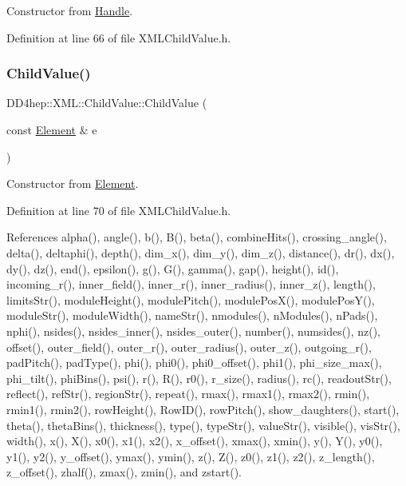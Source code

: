Constructor from \hyperlink{class_d_d4hep_1_1_handle}{Handle}. 



Definition at line 66 of file X\+M\+L\+Child\+Value.\+h.

\hypertarget{struct_d_d4hep_1_1_x_m_l_1_1_child_value_a1295821eee0759c3d9617408b40aedac}{}\label{struct_d_d4hep_1_1_x_m_l_1_1_child_value_a1295821eee0759c3d9617408b40aedac} 
\subsubsection{\texorpdfstring{Child\+Value()}{ChildValue()}\hspace{0.1cm}{\footnotesize\ttfamily [3/3]}}
{\footnotesize\ttfamily D\+D4hep\+::\+X\+M\+L\+::\+Child\+Value\+::\+Child\+Value (\begin{DoxyParamCaption}\item[{const \hyperlink{class_d_d4hep_1_1_x_m_l_1_1_element}{Element} \&}]{e }\end{DoxyParamCaption})\hspace{0.3cm}{\ttfamily [inline]}}



Constructor from \hyperlink{class_d_d4hep_1_1_x_m_l_1_1_element}{Element}. 



Definition at line 70 of file X\+M\+L\+Child\+Value.\+h.



References alpha(), angle(), b(), B(), beta(), combine\+Hits(), crossing\+\_\+angle(), delta(), deltaphi(), depth(), dim\+\_\+x(), dim\+\_\+y(), dim\+\_\+z(), distance(), dr(), dx(), dy(), dz(), end(), epsilon(), g(), G(), gamma(), gap(), height(), id(), incoming\+\_\+r(), inner\+\_\+field(), inner\+\_\+r(), inner\+\_\+radius(), inner\+\_\+z(), length(), limits\+Str(), module\+Height(), module\+Pitch(), module\+Pos\+X(), module\+Pos\+Y(), module\+Str(), module\+Width(), name\+Str(), nmodules(), n\+Modules(), n\+Pads(), nphi(), nsides(), nsides\+\_\+inner(), nsides\+\_\+outer(), number(), numsides(), nz(), offset(), outer\+\_\+field(), outer\+\_\+r(), outer\+\_\+radius(), outer\+\_\+z(), outgoing\+\_\+r(), pad\+Pitch(), pad\+Type(), phi(), phi0(), phi0\+\_\+offset(), phi1(), phi\+\_\+size\+\_\+max(), phi\+\_\+tilt(), phi\+Bins(), psi(), r(), R(), r0(), r\+\_\+size(), radius(), rc(), readout\+Str(), reflect(), ref\+Str(), region\+Str(), repeat(), rmax(), rmax1(), rmax2(), rmin(), rmin1(), rmin2(), row\+Height(), Row\+I\+D(), row\+Pitch(), show\+\_\+daughters(), start(), theta(), theta\+Bins(), thickness(), type(), type\+Str(), value\+Str(), visible(), vis\+Str(), width(), x(), X(), x0(), x1(), x2(), x\+\_\+offset(), xmax(), xmin(), y(), Y(), y0(), y1(), y2(), y\+\_\+offset(), ymax(), ymin(), z(), Z(), z0(), z1(), z2(), z\+\_\+length(), z\+\_\+offset(), zhalf(), zmax(), zmin(), and zstart().



